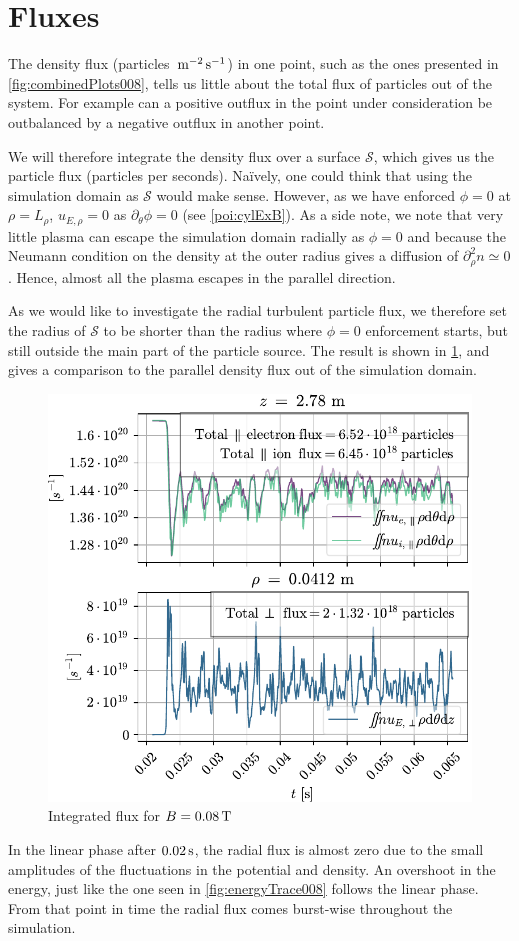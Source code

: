 \section{Fluxes}
\label{sec:fluxes}
%
The density flux (particles $\, \text{m}^{-2}\, \text{s}^{-1}$) in one point, such as the ones presented in \cref{fig:combinedPlots008}, tells us little about the total flux of particles out of the system.
For example can a positive outflux in the point under consideration be outbalanced by a negative outflux in another point.

We will therefore integrate the density flux over a surface $\mathcal{S}$, which gives us the particle flux (particles per seconds).
Na{\"i}vely, one could think that using the simulation domain as $\mathcal{S}$ would make sense.
However, as we have enforced $\phi=0$ at $\rho=L_\rho$, $u_{E,\rho}=0$ as $\partial_\theta \phi=0$ (see \cref{poi:cylExB}).
As a side note, we note that very little plasma can escape the simulation domain radially as $\phi=0$ and because the Neumann condition on the density at the outer radius gives a diffusion of $\partial_\rho^2 n \simeq 0$.
Hence, almost all the plasma escapes in the parallel direction.

As we would like to investigate the radial turbulent particle flux, we therefore set the radius of $\mathcal{S}$ to be shorter than the radius where $\phi=0$ enforcement starts, but still outside the main part of the particle source.
The result is shown in \cref{fig:flux008}, and gives a comparison to the parallel density flux out of the simulation domain.
%
\begin{figure}[htb]
    \centering
    \includegraphics{fig/results/totalFlux/flux008}
    \caption{Integrated flux for $B=0.08\, \text{T}$}
    \label{fig:flux008}
\end{figure}
%
In the linear phase after $0.02\, \text{s}$, the radial flux is almost zero due to the small amplitudes of the fluctuations in the potential and density.
An overshoot in the energy, just like the one seen in \cref{fig:energyTrace008} follows the linear phase.
From that point in time the radial flux comes burst-wise throughout the simulation.

